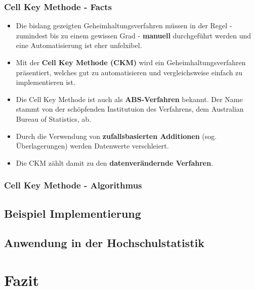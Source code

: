 \documentclass[aspectratio=169]{beamer}
\begin{document}
\begin{frame}{}
	\frametitle{Cell Key Methode - Facts}
    \begin{itemize}
        \item Die bislang gezeigten Geheimhaltungsverfahren müssen in der Regel - zumindest bis zu einem gewissen Grad - \textbf{manuell} durchgeführt werden und eine Automatisierung ist eher unfelxibel.
        \item Mit der \textbf{Cell Key Methode (CKM)} wird ein Geheimhaltungsverfahren präsentiert, welches gut zu automatisieren und vergleichsweise einfach zu implementieren ist.
        \item Die Cell Key Methode ist auch als \textbf{ABS-Verfahren} bekannt. Der Name stammt von der schöpfenden Institutuion des Verfahrens, dem Australian Bureau of Statistics, ab.
        \item Durch die Verwendung von \textbf{zufallsbasierten Additionen} (sog. Überlagerungen) werden Datenwerte verschleiert. 
        \item Die CKM zählt damit zu den \textbf{datenverändernde Verfahren}.
    \end{itemize}
\end{frame}


\begin{frame}{}
	\frametitle{Cell Key Methode - Algorithmus}
\end{frame}


\subsection{Beispiel Implementierung}

\subsection{Anwendung in der Hochschulstatistik}


\section{Fazit}
\end{document}
